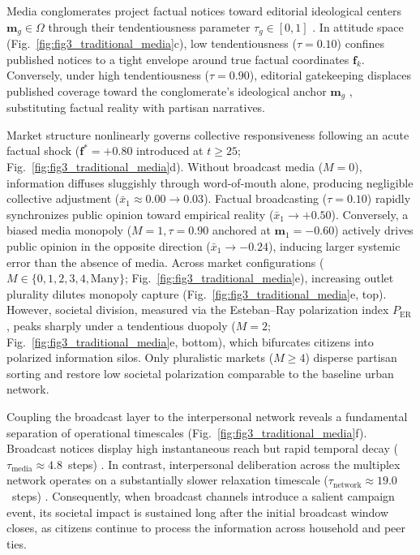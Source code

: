 \documentclass[a4paper,fleqn]{cas-dc}
\begin{document}
Media conglomerates project factual notices toward editorial ideological centers $\mathbf{m}_g \in \Omega$ through their tendentiousness parameter $\tau_g \in [0, 1]$ \citep{mullainathan2005market, gentzkow2006media}. In attitude space (Fig.~\ref{fig:fig3_traditional_media}c), low tendentiousness ($\tau = 0.10$) confines published notices to a tight envelope around true factual coordinates $\mathbf{f}_k$. Conversely, under high tendentiousness ($\tau = 0.90$), editorial gatekeeping displaces published coverage toward the conglomerate's ideological anchor $\mathbf{m}_g$ \citep{puglisi2015newspaper}, substituting factual reality with partisan narratives.

Market structure nonlinearly governs collective responsiveness following an acute factual shock ($\mathbf{f}^* = +0.80$ introduced at $t \ge 25$; Fig.~\ref{fig:fig3_traditional_media}d). Without broadcast media ($M=0$), information diffuses sluggishly through word-of-mouth alone, producing negligible collective adjustment ($\bar{x}_1 \approx 0.00 \to 0.03$). Factual broadcasting ($\tau = 0.10$) rapidly synchronizes public opinion toward empirical reality ($\bar{x}_1 \to +0.50$). Conversely, a biased media monopoly ($M=1, \tau = 0.90$ anchored at $\mathbf{m}_1 = -0.60$) actively drives public opinion in the opposite direction ($\bar{x}_1 \to -0.24$), inducing larger systemic error than the absence of media. Across market configurations ($M \in \{0, 1, 2, 3, 4, \text{Many}\}$; Fig.~\ref{fig:fig3_traditional_media}e), increasing outlet plurality dilutes monopoly capture (Fig.~\ref{fig:fig3_traditional_media}e, top). However, societal division, measured via the Esteban--Ray polarization index $P_{\mathrm{ER}}$ \citep{esteban1994measurement}, peaks sharply under a tendentious duopoly ($M=2$; Fig.~\ref{fig:fig3_traditional_media}e, bottom), which bifurcates citizens into polarized information silos. Only pluralistic markets ($M \ge 4$) disperse partisan sorting and restore low societal polarization comparable to the baseline urban network.

Coupling the broadcast layer to the interpersonal network reveals a fundamental separation of operational timescales (Fig.~\ref{fig:fig3_traditional_media}f). Broadcast notices display high instantaneous reach but rapid temporal decay ($\tau_{\mathrm{media}} \approx 4.8$~steps) \citep{downs1972up}. In contrast, interpersonal deliberation across the multiplex network operates on a substantially slower relaxation timescale ($\tau_{\mathrm{network}} \approx 19.0$~steps) \citep{friedkin1990social}. Consequently, when broadcast channels introduce a salient campaign event, its societal impact is sustained long after the initial broadcast window closes, as citizens continue to process the information across household and peer ties.
\end{document}
